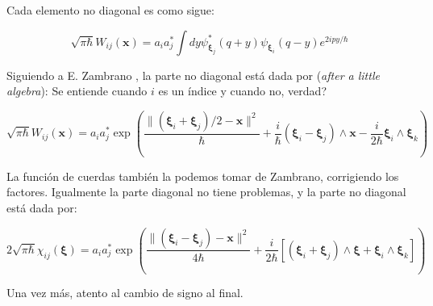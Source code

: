 \documentclass[a4paper,10pt]{article}
\newcommand{\xfase}{\mathbf{x}}
\newcommand{\xifase}{ {\boldsymbol{\xi}} }
\begin{document}
Cada elemento no diagonal es como sigue:

\begin{equation}\label{offdiagonal0}
 \sqrt{\pi\hbar} W_{ij}(\xfase)=a_i a_j^* \int dy \psi_{\xifase_j}^*(q+y)
\psi_{\xifase_i}(q-y)e^{2ipy/\hbar}
\end{equation}

Siguiendo a E. Zambrano \cite{tesiseduardo},
la parte no diagonal está dada por (\emph{after a little algebra}):
Se entiende cuando $i$ es un índice y cuando no, verdad?

\begin{equation}\label{offdiagonal1}
 \sqrt{\pi\hbar} W_{ij}(\xfase)=a_i a_j^*\exp\left(
\frac{\|(\xifase_i+\xifase_j)/2-\xfase\|^2}{\hbar}+
\frac{i}{\hbar}(\xifase_i-\xifase_j)\wedge \xfase-
\frac{i}{2\hbar}\xifase_i\wedge \xifase_k
\right)
\end{equation}

La función de cuerdas también la podemos tomar de Zambrano, 
corrigiendo los factores. Igualmente la parte diagonal
no tiene problemas, y la parte no diagonal está dada por:

\begin{equation}\label{chioffdiagonal1}
 2\sqrt{\pi\hbar} \chi_{ij}(\xifase)=a_i a_j^*\exp\left(
\frac{\|(\xifase_i-\xifase_j)-\xfase\|^2}{4\hbar}+
\frac{i}{2\hbar}[(\xifase_i+\xifase_j)\wedge \xifase+
\xifase_i\wedge \xifase_k]
\right)
\end{equation}

Una vez más, atento al cambio de signo al final.
\end{document}
